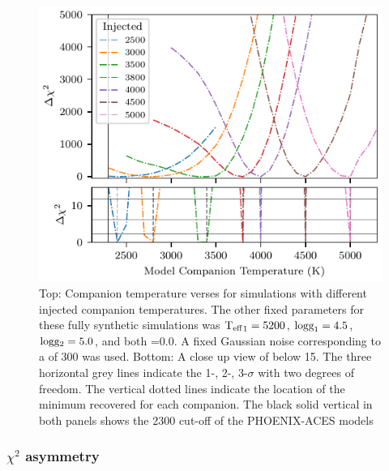 \begin{figure}
    \centering
    \includegraphics[width=0.7\linewidth]{figures/companion_recovery/chi2_shape_investigation_with_delta}
    \caption[Shape of simulated \textchisquared{} with different injected companion temperatures.]{Top: Companion temperature verses \textchisquared{} for simulations with different injected companion temperatures.
        The other fixed parameters for these fully synthetic simulations was \({\textrm{T}_{\mathrm{eff}}}_{1}=5200\)\K{}, \(\textrm{logg}_{1}=4.5\), \(\textrm{logg}{}_{2}=5.0\), and both \feh{}=0.0.
        A fixed Gaussian noise corresponding to a \snr{} of 300 was used.
        Bottom: A close up view of \textchisquared{} below 15.
        The three horizontal grey lines indicate the 1-, 2-, 3-$\sigma$ with two degrees of freedom.
        The vertical dotted lines indicate the location of the minimum \textchisquared{} recovered for each companion.
        The black solid vertical in both panels shows the 2300\K{} cut-off of the {PHOENIX-ACES} models}
    \label{fig:injection_shape}
\end{figure}

\todo{}
\subsubsection{\(\chi^2\) asymmetry} 
\label{subsubsec:chi2_assymetry}

